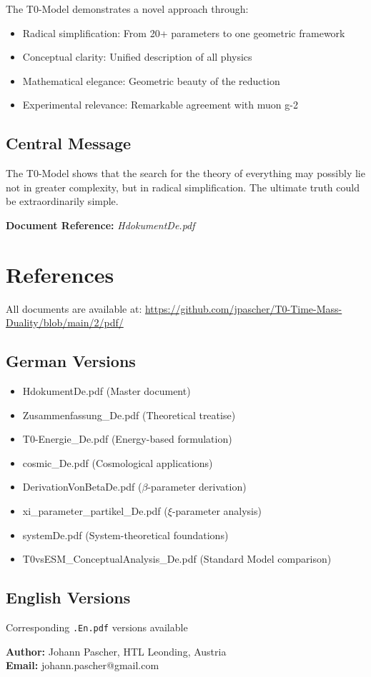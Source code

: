 \documentclass[12pt,a4paper]{article}
\newcommand{\xipar}{\xi}
\newcommand{\betapar}{\beta}
\begin{document}
	The T0-Model demonstrates a novel approach through:
	
	\begin{itemize}
		\item Radical simplification: From 20+ parameters to one geometric framework
		\item Conceptual clarity: Unified description of all physics
		\item Mathematical elegance: Geometric beauty of the reduction
		\item Experimental relevance: Remarkable agreement with muon g-2
	\end{itemize}
	
	\subsection{Central Message}
	
	The T0-Model shows that the search for the theory of everything may possibly lie not in greater complexity, but in radical simplification. The ultimate truth could be extraordinarily simple.
	
	\textbf{Document Reference:} \textit{HdokumentDe.pdf}
	
	\section{References}
	
	All documents are available at: \url{https://github.com/jpascher/T0-Time-Mass-Duality/blob/main/2/pdf/}
	
	\subsection{German Versions}
	
	\begin{itemize}
		\item HdokumentDe.pdf (Master document)
		\item Zusammenfassung\_De.pdf (Theoretical treatise)
		\item T0-Energie\_De.pdf (Energy-based formulation)
		\item cosmic\_De.pdf (Cosmological applications)
		\item DerivationVonBetaDe.pdf ($\betapar$-parameter derivation)
		\item xi\_parameter\_partikel\_De.pdf ($\xipar$-parameter analysis)
		\item systemDe.pdf (System-theoretical foundations)
		\item T0vsESM\_ConceptualAnalysis\_De.pdf (Standard Model comparison)
	\end{itemize}
	
	\subsection{English Versions}
	
	Corresponding \texttt{.En.pdf} versions available
	
	\textbf{Author:} Johann Pascher, HTL Leonding, Austria\\
	\textbf{Email:} johann.pascher@gmail.com
	
\end{document}
